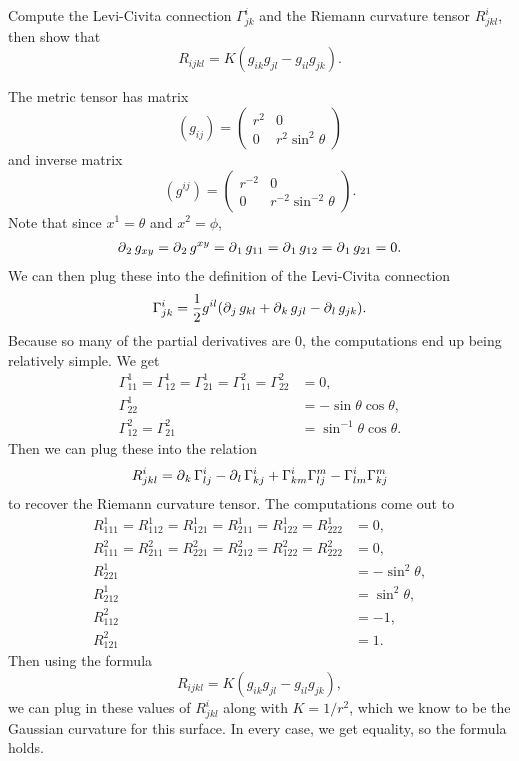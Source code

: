\documentclass[twoside,10pt]{report}
\begin{document}
\newpage
\begin{exer}[]
	Compute the Levi-Civita connection $\Gamma^{i}_{jk}$ and the Riemann curvature tensor $R^{i}_{jkl}$, then show that
	\[
		R_{ijkl} = K(g_{ik}g_{jl}-g_{il}g_{jk}).
	\] 
\end{exer}
The metric tensor has matrix
\[
	(g_{ij}) =
\begin{pmatrix}
	r^{2}&0\\
	0&r^{2}\sin^{2}\theta
\end{pmatrix}
\] and inverse matrix
\[
	(g^{ij}) =
	\begin{pmatrix}
		r^{-2}&0\\
		0&r^{-2}\sin^{-2}\theta
	\end{pmatrix}.
\] 
Note that since $x^{1}=\theta$ and $x^{2}=\phi$,
\begin{align*}
	\operatorname{\partial}_{2}{g_{xy}} =\operatorname{\partial}_{2}{g^{xy}} = \operatorname{\partial}_{1}{g_{11}} =\operatorname{\partial}_{1}{g_{12}} =\operatorname{\partial}_{1}{g_{21}} =0.
\end{align*}
We can then plug these into the definition of the Levi-Civita connection
\[
	\Gamma^{i}_{jk} = \frac{1}{2} g^{il}(\operatorname{\partial}_{j}{g_{kl}} +\operatorname{\partial}_{k}{g_{jl}} -\operatorname{\partial}_{l}{g_{jk}} ).
\] 
Because so many of the partial derivatives are 0, the computations end up being relatively simple. We get
\begin{align*}
	\Gamma^{1}_{11} = \Gamma^{1}_{12}=\Gamma^{1}_{21}=\Gamma^{2}_{11}=\Gamma^{2}_{22}&=0,\\
	\Gamma^{1}_{22} &= -\sin\theta\cos\theta,\\
	\Gamma^{2}_{12}=\Gamma^{2}_{21}&=\sin^{-1}\theta\cos\theta.
\end{align*}
Then we can plug these into the relation
\[
R^{i}_{jkl}=\operatorname{\partial}_{k}{\Gamma^{i}_{lj}} -\operatorname{\partial}_{l}{\Gamma^{i}_{kj}} + \Gamma^{i}_{km}\Gamma^{m}_{lj}-\Gamma^{i}_{lm}\Gamma^{m}_{kj}
\] to recover the Riemann curvature tensor. The computations come out to
\begin{align*}
	R^{1}_{111}=R^{1}_{112}=R^{1}_{121}=R^{1}_{211}=R^{1}_{122}=R^{1}_{222} &= 0,\\
	R^{2}_{111}=R^{2}_{211}=R^{2}_{221}=R^{2}_{212}=R^{2}_{122}=R^{2}_{222} &= 0,\\
	R^{1}_{221} &= -\sin^{2}\theta,\\
	R^{1}_{212} &= \sin^{2}\theta,\\
	R^{2}_{112} &= -1,\\
	R^{2}_{121} &= 1.
\end{align*}
Then using the formula
\[
R_{ijkl} = K(g_{ik}g_{jl}-g_{il}g_{jk}),
\] 
we can plug in these values of $R^{i}_{jkl}$ along with $K=1/r^{2}$, which we know to be the Gaussian curvature for this surface. In every case, we get equality, so the formula holds.
\end{document}
